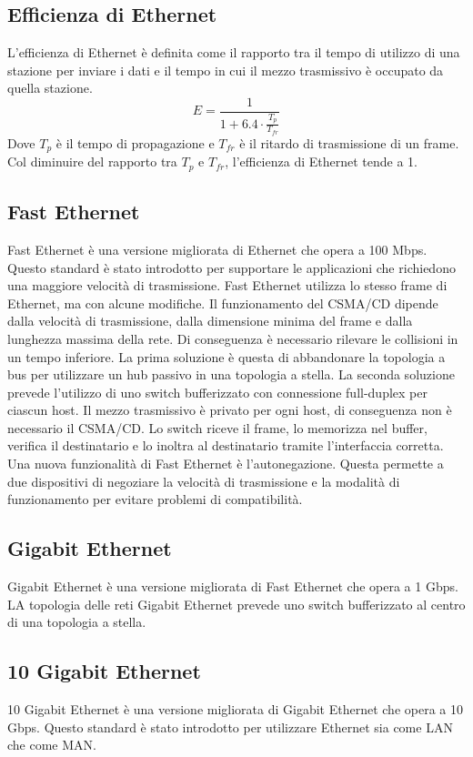 \documentclass[12pt]{report}
\begin{document}
\subsection{Efficienza di Ethernet}
L'efficienza di Ethernet è definita come il rapporto tra il tempo di utilizzo di una stazione per inviare i dati e il tempo in cui il mezzo trasmissivo è occupato da quella stazione.
\[
	E = \frac{1}{1 + 6.4 \cdot \frac{T_p}{T_{fr}}}
\]
Dove \(T_p\) è il tempo di propagazione e \(T_{fr}\) è il ritardo di trasmissione di un frame. Col diminuire del rapporto tra \(T_p\) e \(T_{fr}\), l'efficienza di Ethernet tende a 1. 

\subsection{Fast Ethernet}
Fast Ethernet è una versione migliorata di Ethernet che opera a 100 Mbps. Questo standard è stato introdotto per supportare le applicazioni che richiedono una maggiore velocità di trasmissione. Fast Ethernet utilizza lo stesso frame di Ethernet, ma con alcune modifiche. Il funzionamento del CSMA/CD dipende dalla velocità di trasmissione, dalla dimensione minima del frame e dalla lunghezza massima della rete. Di conseguenza è necessario rilevare le collisioni in un tempo inferiore. La prima soluzione è questa di abbandonare la topologia a bus per utilizzare un hub passivo in una topologia a stella. La seconda soluzione prevede l'utilizzo di uno switch bufferizzato con connessione full-duplex per ciascun host. Il mezzo trasmissivo è privato per ogni host, di conseguenza non è necessario il CSMA/CD. Lo switch riceve il frame, lo memorizza nel buffer, verifica il destinatario e lo inoltra al destinatario tramite l'interfaccia corretta. Una nuova funzionalità di Fast Ethernet è l'autonegazione. Questa permette a due dispositivi di negoziare la velocità di trasmissione e la modalità di funzionamento per evitare problemi di compatibilità.

\subsection{Gigabit Ethernet}
Gigabit Ethernet è una versione migliorata di Fast Ethernet che opera a 1 Gbps. LA topologia delle reti Gigabit Ethernet prevede uno switch bufferizzato al centro di una topologia a stella.

\subsection{10 Gigabit Ethernet}
10 Gigabit Ethernet è una versione migliorata di Gigabit Ethernet che opera a 10 Gbps. Questo standard è stato introdotto per utilizzare Ethernet sia come LAN che come MAN.
\end{document}
